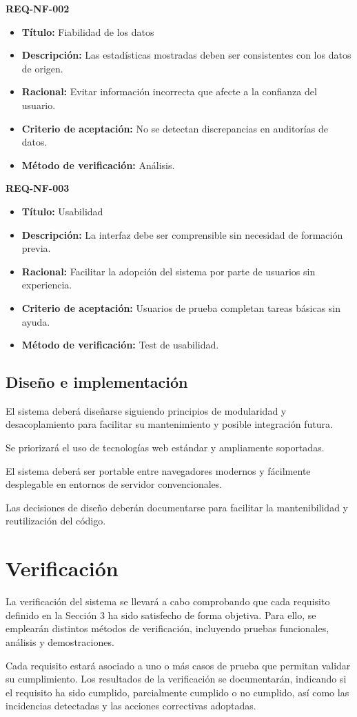 \textbf{REQ-NF-002}
\begin{itemize}
    \item \textbf{Título:} Fiabilidad de los datos
    \item \textbf{Descripción:} Las estadísticas mostradas deben ser consistentes con los datos de origen.
    \item \textbf{Racional:} Evitar información incorrecta que afecte a la confianza del usuario.
    \item \textbf{Criterio de aceptación:} No se detectan discrepancias en auditorías de datos.
    \item \textbf{Método de verificación:} Análisis.
\end{itemize}

\textbf{REQ-NF-003}
\begin{itemize}
    \item \textbf{Título:} Usabilidad
    \item \textbf{Descripción:} La interfaz debe ser comprensible sin necesidad de formación previa.
    \item \textbf{Racional:} Facilitar la adopción del sistema por parte de usuarios sin experiencia.
    \item \textbf{Criterio de aceptación:} Usuarios de prueba completan tareas básicas sin ayuda.
    \item \textbf{Método de verificación:} Test de usabilidad.
\end{itemize}

\subsection{Diseño e implementación}

El sistema deberá diseñarse siguiendo principios de modularidad y desacoplamiento para facilitar su mantenimiento y posible integración futura.

 Se priorizará el uso de tecnologías web estándar y ampliamente soportadas.

 El sistema deberá ser portable entre navegadores modernos y fácilmente desplegable en entornos de servidor convencionales.

 Las decisiones de diseño deberán documentarse para facilitar la mantenibilidad y reutilización del código.

\section{Verificación}

La verificación del sistema se llevará a cabo comprobando que cada requisito definido en la Sección 3 ha sido satisfecho de forma objetiva. Para ello, se emplearán distintos métodos de verificación, incluyendo pruebas funcionales, análisis y demostraciones.

Cada requisito estará asociado a uno o más casos de prueba que permitan validar su cumplimiento. Los resultados de la verificación se documentarán, indicando si el requisito ha sido cumplido, parcialmente cumplido o no cumplido, así como las incidencias detectadas y las acciones correctivas adoptadas.